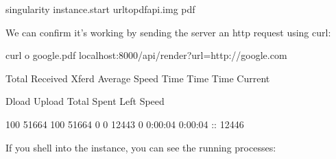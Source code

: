 \documentclass[letterpaper,10pt,english]{sphinxmanual}
\begin{document}
%
\begin{sphinxVerbatim}[commandchars=\\\{\}]
\PYGZdl{} singularity instance.start url\PYGZhy{}to\PYGZhy{}pdf\PYGZhy{}api.img pdf
\end{sphinxVerbatim}

We can confirm it’s working by sending the server an http request using
curl:

%
\begin{sphinxVerbatim}[commandchars=\\\{\}]
\PYGZdl{} curl \PYGZhy{}o google.pdf localhost:8000/api/render?url=http://google.com

  \PYGZpc{} Total    \PYGZpc{} Received \PYGZpc{} Xferd  Average Speed   Time    Time     Time  Current

                                 Dload  Upload   Total   Spent    Left  Speed

100 51664  100 51664    0     0  12443      0  0:00:04  0:00:04 \PYGZhy{}\PYGZhy{}:\PYGZhy{}\PYGZhy{}:\PYGZhy{}\PYGZhy{} 12446
\end{sphinxVerbatim}

If you shell into the instance, you can see the running processes:
\end{document}
